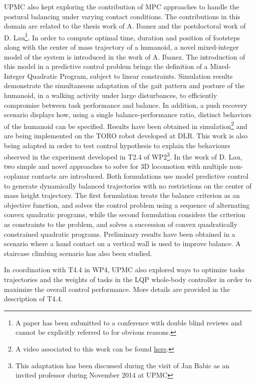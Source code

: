 UPMC also kept exploring the contribution of MPC approaches to  handle the postural balancing under varying contact conditions. The contributions in this domain are related to the thesis work of A. Ibanez \cite{ibanezIROS2014} and the postdoctoral work of D. Lau\footnote{A paper has been submitted to a conference with double blind reviews and cannot be explicitly referred to for obvious reasons.}.  In order to compute optimal time, duration and position of footsteps along with the center of mass trajectory of a humanoid, a novel mixed-integer model of the system is introduced in the work of A. Ibanez. The introduction of this model in a predictive control problem brings the definition of a Mixed-Integer Quadratic Program, subject to linear constraints. Simulation results demonstrate the simultaneous adaptation of the gait pattern and posture of the humanoid, in a walking activity under large disturbances, to efficiently compromise between task performance and balance. In addition, a push recovery scenario displays how, using a single balance-performance ratio, distinct behaviors of the humanoid can be specified. Results have been obtained in simulation\footnote{A video associated to this work can be found \href{http://pages.isir.upmc.fr/~padois/website/fichiers/videos/ibanez\_IROS2014.mp4}{here}.} and are being implemented on the TORO robot developed at DLR. This work is also being adapted in order to test control hypothesis to explain the behaviours observed in the experiment developed in T2.4 of WP2\footnote{This adaptation has been discussed during the visit of Jan Babic as an invited professor during November 2014 at  UPMC}. In the work of D. Lau, two simple and novel approaches to solve for 3D locomotion with multiple non-coplanar contacts are introduced. Both formulations use model predictive control to generate dynamically balanced trajectories with no restrictions on the center of mass height trajectory. The first formulation treats the balance criterion as an objective function, and solves the control problem using a sequence of alternating convex quadratic programs, while the second formulation considers the criterion as constraints to the problem, and solves a succession of convex quadratically constrained quadratic programs. Preliminary results have been obtained in a scenario where a hand contact on a vertical wall is used to improve balance. A staircase climbing scenario has also been studied.

In coordination with T4.4 in WP4, UPMC also explored ways to optimize tasks trajectories \cite{lober-HUMANOIDS2014} and the weights of tasks \cite{lobersubmittedIROS2015} in the LQP whole-body controller in order to maximize the overall control performance. More details are provided in the description of T4.4.\\

